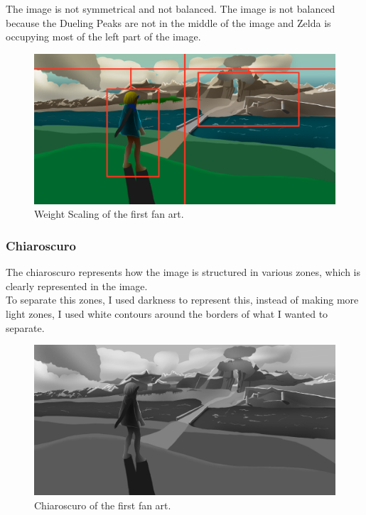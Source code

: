 \documentclass{cup-pan}
\begin{document}
            The image is not symmetrical and not balanced. The image is not balanced because the Dueling Peaks are not in the middle of the image and Zelda is occupying most of the left part of the image.\\
            \begin{figure}[H]
                \includegraphics[width=\textwidth]{Imagenes/Fanart1/Analysis/balanza.png}
                \caption{Weight Scaling of the first fan art.}
            \end{figure}

        \subsubsection{Chiaroscuro}

            The chiaroscuro represents how the image is structured in various zones, which is clearly represented in the image.\\
            To separate this zones, I used darkness to represent this, instead of making more light zones, I used white contours around the borders of what I wanted to separate.\\
            \begin{figure}[H]
                \includegraphics[width=\textwidth]{Imagenes/Fanart1/Analysis/claroscuro.png}
                \caption{Chiaroscuro of the first fan art.}
            \end{figure}
\end{document}
